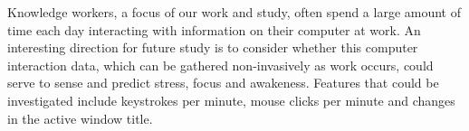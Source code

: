 \vspace{-4mm}
Knowledge workers, a focus of our work and study, often spend
a large amount of time each day interacting with information on 
their computer at work. An interesting direction for future study
is to consider whether this computer interaction data, which can
be gathered non-invasively as work occurs, could serve to sense
and predict stress, focus and awakeness. Features that could be
investigated include keystrokes per minute, mouse clicks per minute
and changes in the active window title.









